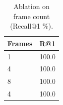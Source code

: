\begin{table}[h!]
\centering
\caption{Ablation on frame count (Recall@1 \%).}
\label{tab:ablation}
\begin{tabular}{l c}
\toprule
Frames & R@1 \\
\midrule
1 & 100.0 \\
4 & 100.0 \\
8 & 100.0 \\
4 & 100.0 \\
\bottomrule
\end{tabular}
\end{table}